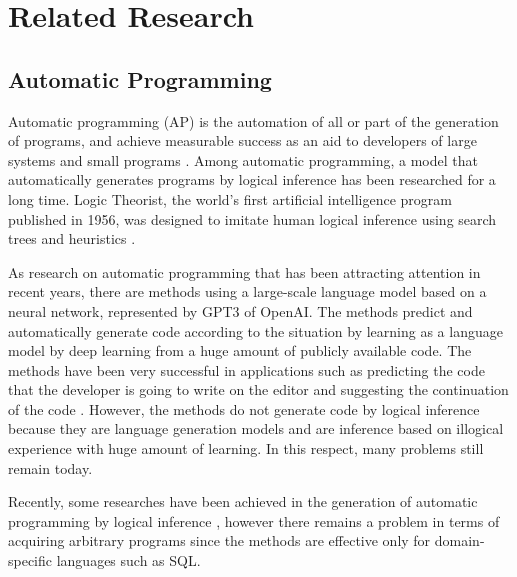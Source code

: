\documentclass{article}
\begin{document}
\section{Related Research}
\subsection{Automatic Programming}
\label{sec:headings}
Automatic programming (AP) is the automation of all or part of the generation of programs, and achieve measurable success as an aid to developers of large systems and small programs \cite{AutomaticProgramming}. 
Among automatic programming, a model that automatically generates programs by logical inference has been researched for a long time.
Logic Theorist, the world's first artificial intelligence program published in 1956, was designed to imitate human logical inference using search trees and heuristics \cite{LogicTheorist}.

As research on automatic programming that has been attracting attention in recent years, there are methods using a large-scale language model based on a neural network, represented by GPT3 \cite{gpt3} of OpenAI.
The methods predict and automatically generate code according to the situation by learning as a language model by deep learning from a huge amount of publicly available code.
The methods have been very successful in applications such as predicting the code that the developer is going to write on the editor and suggesting the continuation of the code \cite{copilot}.
However, the methods do not generate code by logical inference because they are language generation models and are inference based on illogical experience with huge amount of learning.
In this respect, many problems still remain today.

Recently, some researches have been achieved in the generation of automatic programming by logical inference \cite{palsql}, however there remains a problem in terms of acquiring arbitrary programs since the methods are effective only for domain-specific languages such as SQL.
\end{document}
